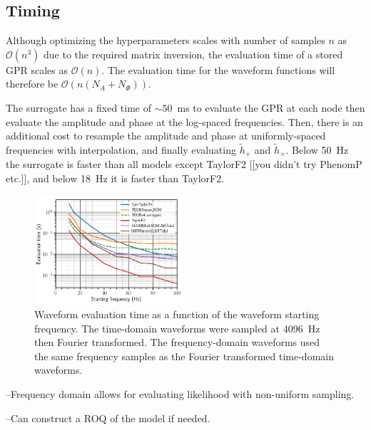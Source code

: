 \documentclass[prd,aps,letter,twocolumn,floatfix,notitlepage,nofootinbib]{revtex4-1}
\begin{document}
%



\subsection{Timing}

Although optimizing the hyperparameters scales with number of samples $n$ as $\mathcal{O}(n^3)$
due to the required matrix inversion, the evaluation time of a stored GPR scales as $\mathcal{O}(n)$.
The evaluation time for the waveform functions will therefore be $\mathcal{O}(n(N_A+N_\Phi))$.

The surrogate has a fixed time of $\sim 50$~ms to evaluate the GPR at each node then evaluate the amplitude
and phase at the log-spaced frequencies. Then, there is an additional cost to resample the amplitude and phase
at uniformly-spaced frequencies with interpolation, and finally evaluating $\tilde h_+$ and $\tilde h_\times$. 
Below 50~Hz the surrogate is faster than all models except TaylorF2 [[you didn't try PhenomP etc.]], and below
18~Hz it is faster than TaylorF2. 

\begin{figure}[htb]
\centering
\includegraphics[width=0.49\textwidth]{timing.png}
\caption{Waveform evaluation time as a function of the waveform starting frequency. The time-domain waveforms
were sampled at 4096~Hz then Fourier transformed. The frequency-domain waveforms used the
same frequency samples as the Fourier transformed time-domain waveforms.}
\label{fig:timing}
\end{figure}

--Frequency domain allows for evaluating likelihood with non-uniform sampling.

--Can construct a ROQ of the model if needed.

%
\end{document}
